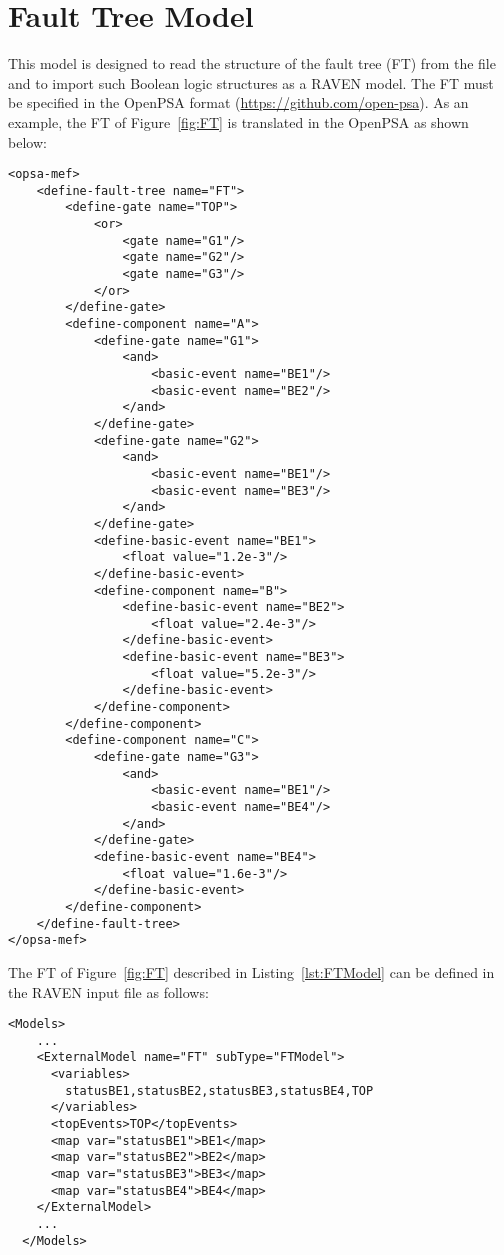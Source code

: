 \section{Fault Tree Model}
\label{sec:FTModel}

This model is designed to read the structure of the fault tree (FT) from the file and to import such Boolean logic structures as a RAVEN model.
The FT must be specified in the OpenPSA format (\href{<url>}{https://github.com/open-psa}).
As an example, the FT of Figure~\ref{fig:FT} is translated in the OpenPSA as shown below:

\begin{lstlisting}[style=XML,morekeywords={anAttribute},caption=FT in OpenPSA format., label=lst:FTModel]
<opsa-mef>
    <define-fault-tree name="FT">
        <define-gate name="TOP">
            <or>
                <gate name="G1"/>
                <gate name="G2"/>
                <gate name="G3"/>
            </or>
        </define-gate>
        <define-component name="A">
            <define-gate name="G1">
                <and>
                    <basic-event name="BE1"/>
                    <basic-event name="BE2"/>
                </and>
            </define-gate>
            <define-gate name="G2">
                <and>
                    <basic-event name="BE1"/>
                    <basic-event name="BE3"/>
                </and>
            </define-gate>
            <define-basic-event name="BE1">
                <float value="1.2e-3"/>
            </define-basic-event>
            <define-component name="B">
                <define-basic-event name="BE2">
                    <float value="2.4e-3"/>
                </define-basic-event>
                <define-basic-event name="BE3">
                    <float value="5.2e-3"/>
                </define-basic-event>
            </define-component>
        </define-component>
        <define-component name="C">
            <define-gate name="G3">
                <and>
                    <basic-event name="BE1"/>
                    <basic-event name="BE4"/>
                </and>
            </define-gate>
            <define-basic-event name="BE4">
                <float value="1.6e-3"/>
            </define-basic-event>
        </define-component>
    </define-fault-tree>
</opsa-mef>
\end{lstlisting}

The FT of Figure~\ref{fig:FT} described in Listing~\ref{lst:FTModel} can be defined in the RAVEN input file as follows:

\begin{lstlisting}[style=XML,morekeywords={anAttribute},caption=FT model input example., label=lst:FT_InputExample]
  <Models>
    ...
    <ExternalModel name="FT" subType="FTModel">
      <variables>
        statusBE1,statusBE2,statusBE3,statusBE4,TOP
      </variables>
      <topEvents>TOP</topEvents>
      <map var="statusBE1">BE1</map>
      <map var="statusBE2">BE2</map>
      <map var="statusBE3">BE3</map>
      <map var="statusBE4">BE4</map>
    </ExternalModel>
    ...
  </Models>
\end{lstlisting}

